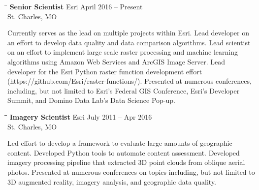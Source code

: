 \documentclass{res}
\begin{document}
\begin{resume}
   \begin{tabbing}
	\hspace{2.3in}\= \hspace{2.6in}\= \kill %
	{\bf Senior Scientist} \>Esri     \>April 2016 -- Present\\
	\>St. Charles, MO
\end{tabbing}\vspace{-20pt}      %
Currently serves as the lead on multiple projects within Esri. Lead developer on an effort to develop data quality and data comparison algorithms. Lead scientist on an effort to implement large scale raster processing and machine learning algorithms using Amazon Web Services and ArcGIS Image Server. Lead developer for the Esri Python raster function development effort (https://github.com/Esri/raster-functions/). Presented at numerous conferences, including, but not limited to Esri's Federal GIS Conference, Esri's Developer Summit, and Domino Data Lab's Data Science Pop-up.

   \begin{tabbing}
	\hspace{2.3in}\= \hspace{2.6in}\= \kill %
	{\bf Imagery Scientist} \>Esri     \>July 2011 -- Apr 2016\\
	\>St. Charles, MO
\end{tabbing}\vspace{-20pt}      %
Led effort to develop a framework to evaluate large amounts of geographic content. Developed Python tools to automate content assessment. Developed imagery processing pipeline that extracted 3D point clouds from oblique aerial photos. Presented at numerous conferences on topics including, but not limited to 3D augmented reality, imagery analysis, and geographic data quality.


\end{resume}
\end{document}
